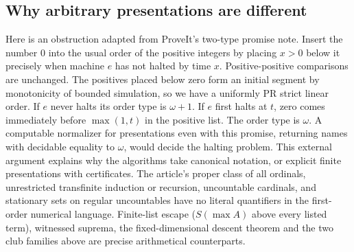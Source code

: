 \subsection{Why arbitrary presentations are different}
Here is an obstruction adapted from ProveIt's two-type promise note. Insert the number $0$ into the usual order of the positive integers by placing $x>0$ below it precisely when machine $e$ has not halted by time $x$. Positive-positive comparisons are unchanged. The positives placed below zero form an initial segment by monotonicity of bounded simulation, so we have a uniformly PR strict linear order. If $e$ never halts its order type is $\omega+1$. If $e$ first halts at $t$, zero comes immediately before $\max(1,t)$ in the positive list. The order type is $\omega$. A computable normalizer for presentations even with this promise, returning names with decidable equality to $\omega$, would decide the halting problem. This external argument explains why the algorithms take canonical notation, or explicit finite presentations with certificates. The article's proper class of all ordinals, unrestricted transfinite induction or recursion, uncountable cardinals, and stationary sets on regular uncountables have no literal quantifiers in the first-order numerical language. Finite-list escape ($S(\max A)$ above every listed term), witnessed suprema, the fixed-dimensional descent theorem and the two club families above are precise arithmetical counterparts.
